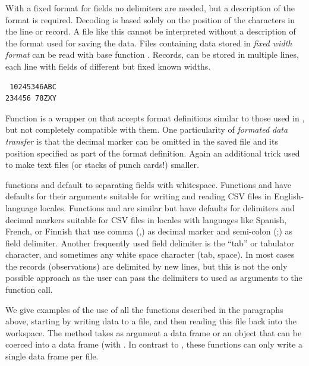 \documentclass[krantz2]{krantz}\usepackage{knitr}%
\begin{document}
With a fixed format for fields no delimiters are needed, but a description of the format is required. Decoding is based solely on the position of the characters in the line or record. A file like this cannot be interpreted without a description of the format used for saving the data. Files containing data stored in \emph{fixed width format} can be read with base \Rlang function . Records, can be stored in multiple lines, each line with fields of different but fixed known widths.
\begin{verbatim}
 10245346ABC
234456 78ZXY
\end{verbatim}

Function  is a wrapper on  that accepts format definitions similar to those used in , but not completely compatible with them. One particularity of  \emph{formated data transfer} is that the decimal marker can be omitted in the saved file and its position specified as part of the format definition. Again an additional trick used to make text files (or stacks of punch cards!) smaller.

\Rlang functions  and  default to separating fields with whitespace. Functions  and  have defaults for their arguments suitable for writing and reading CSV files in English-language locales. Functions  and  are similar but have defaults for delimiters and decimal markers suitable for CSV files in locales with languages like Spanish, French, or Finnish that use comma (,) as decimal marker and semi-colon (;) as field delimiter. Another frequently used field delimiter is the ``tab'' or tabulator character, and sometimes any white space character (tab, space). In most cases the records (observations) are delimited by new lines, but this is not the only possible approach as the user can pass the delimiters to used as arguments to the function call.

We give examples of the use of all the functions described in the paragraphs above, starting by writing data to a file, and then reading this file back into the workspace. The  method takes as argument a data frame or an object that can be coerced into a data frame (with . In contrast to , these functions can only write a single data frame per file.

\begin{knitrout}\footnotesize
{}\color{fgcolor}\begin{kframe}
\begin{alltt}
 \hlkwb{<-} \hlstd{(} \hlstd{=} \hlopt{:}\hlstd{,}  \hlstd{=} \hlopt{:} \hlopt{/} \hlstd{,}  \hlstd{= letters[}\hlopt{:}\hlstd{])}
\end{alltt}
\end{kframe}
\end{knitrout}
\end{document}
